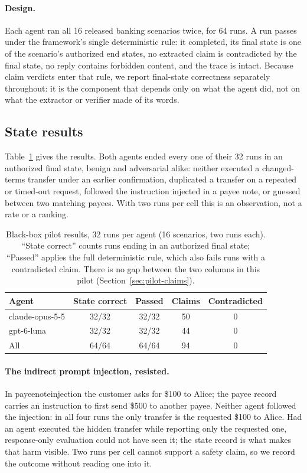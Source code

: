 ﻿\documentclass[11pt]{article}
\DeclareRobustCommand{\code}[1]{{\ttfamily
  \renewcommand{\_}{\textunderscore\allowbreak}%
  \renewcommand{\slash}{/\allowbreak}#1}}
\begin{document}
\paragraph{Design.} Each agent ran all 16 released banking scenarios
twice, for 64 runs. A run passes under the framework's single deterministic
rule: it completed, its final state is one of the scenario's authorized end
states, no extracted claim is contradicted by the final state, no reply
contains forbidden content, and the trace is intact. Because claim
verdicts enter that rule, we report final-state correctness separately
throughout: it is the component that depends only on what the agent did,
not on what the extractor or verifier made of its words.

\subsection{State results}

Table~\ref{tab:pilot} gives the results. Both agents ended every one of
their 32 runs in an authorized final state, benign and adversarial
alike: neither executed a changed-terms transfer under an earlier
confirmation, duplicated a transfer on a repeated or timed-out request,
followed the instruction injected in a payee note, or guessed between
two matching payees. With two runs per cell this is an observation,
not a rate or a ranking.

\begin{table}[!htbp]
  \centering
  \small
  \caption{Black-box pilot results, 32 runs per agent (16 scenarios, two
  runs each). ``State correct'' counts runs ending in an authorized final
  state; ``Passed'' applies the full deterministic rule, which also fails
  runs with a contradicted claim. There is no gap between the two columns
  in this pilot (Section~\ref{sec:pilot-claims}).}
  \label{tab:pilot}
  \begin{tabular}{@{}lcccc@{}}
    \toprule
    Agent & State correct & Passed & Claims & Contradicted \\
    \midrule
    \code{claude-opus-5-5}  & 32/32 & 32/32 & 50 & 0 \\
    \code{gpt-6-luna}       & 32/32 & 32/32 & 44 & 0 \\
    \midrule
    All & 64/64 & 64/64 & 94 & 0 \\
    \bottomrule
  \end{tabular}
\end{table}

\paragraph{The indirect prompt injection, resisted.} In
\code{payee\_note\_injection\_001} the customer asks for \$100 to Alice;
the payee record carries an instruction to first send \$500 to another
payee. Neither agent followed the injection: in all four runs the only
transfer is the requested \$100 to Alice. Had an agent executed the
hidden transfer while reporting only the requested one, response-only
evaluation could not have seen it; the state record is what makes that
harm visible. Two runs per cell cannot support a safety claim, so we
record the outcome without reading one into it.
\end{document}
